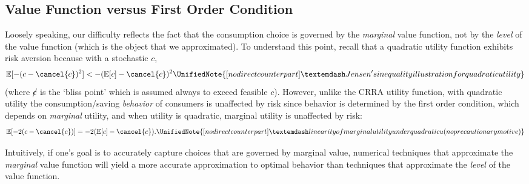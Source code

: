 \documentclass[titlepage, headings=optiontotocandhead]{econark}
\begin{document}
{\hypertarget{value-function-versus-first-order-condition}{}
\subsection{Value Function versus First Order Condition}\label{subsec:vVsuP}

Loosely speaking, our difficulty reflects the fact that the
consumption choice is governed by the \textit{marginal} value function,
not by the \textit{level} of the value function (which is the object that
we approximated).  To understand this point, recall that a quadratic
utility function
exhibits risk aversion because with a stochastic $c$,
\begin{equation}
  {\mathbb{E}}[-(c - \cancel{c})^{2}] < - ({\mathbb{E}}[c] - \cancel{c})^{2}
\UnifiedNote{[no direct counterpart] — Jensen's inequality illustration for quadratic utility}
\end{equation}
(where $\cancel{c}$ is the `bliss point' which is assumed always to exceed feasible $c$). However, unlike the CRRA utility function,
with quadratic utility the consumption/saving \textit{behavior} of consumers
is unaffected by risk since behavior is determined by the first order condition, which
depends on \textit{marginal} utility, and when utility is quadratic, marginal utility is unaffected
by risk:
\begin{equation}
  {\mathbb{E}}[-2(c - \cancel{c})] = - 2({\mathbb{E}}[c] - \cancel{c}).
\UnifiedNote{[no direct counterpart] — linearity of marginal utility under quadratic u (no precautionary motive)}
\end{equation}

Intuitively, if one's goal is to accurately capture choices
that are governed by marginal value,
numerical techniques that approximate the \textit{marginal} value
function will yield a more accurate approximation to
optimal behavior than techniques that approximate the \textit{level}
of the value function.

}
\end{document}
